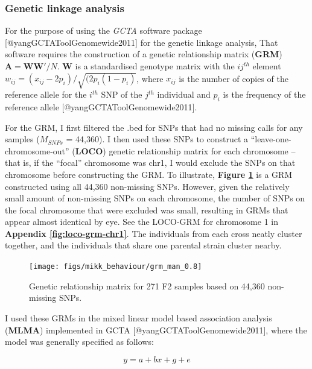 \documentclass[
]{article}
\begin{document}
\hypertarget{genetic-linkage-analysis}{%
\subsubsection{Genetic linkage analysis}\label{genetic-linkage-analysis}}

For the purpose of using the \emph{GCTA} software package {[}@yangGCTAToolGenomewide2011{]} for the genetic linkage analysis, That software requires the construction of a genetic relationship matrix (\textbf{GRM}) \(\textbf{A} = \textbf{WW}'/N\). \(\textbf{W}\) is a standardised genotype matrix with the \(ij^{th}\) element \(w_{ij} = (x_{ij} - 2p_i) / \sqrt{(2p_i(1-p_i)}\), where \(x_{ij}\) is the number of copies of the reference allele for the \(i^{th}\) SNP of the \(j^{th}\) individual and \(p_i\) is the frequency of the reference allele {[}@yangGCTAToolGenomewide2011{]}.

For the GRM, I first filtered the .bed for SNPs that had no missing calls for any samples (\(M_{SNPs}\) = 44,360). I then used these SNPs to construct a ``leave-one-chromosome-out'' (\textbf{LOCO}) genetic relationship matrix for each chromosome -- that is, if the ``focal'' chromosome was chr1, I would exclude the SNPs on that chromosome before constructing the GRM. To illustrate, \textbf{Figure \ref{fig:F2-grm}} is a GRM constructed using all 44,360 non-missing SNPs. However, given the relatively small amount of non-missing SNPs on each chromosome, the number of SNPs on the focal chromosome that were excluded was small, resulting in GRMs that appear almost identical by eye. See the LOCO-GRM for chromosome 1 in \textbf{Appendix \ref{fig:loco-grm-chr1}}. The individuals from each cross neatly cluster together, and the individuals that share one parental strain cluster nearby.



\begin{figure}
\texttt{[image: figs/mikk\_behaviour/grm\_man\_0.8]} \caption{Genetic relationship matrix for 271 F2 samples based on 44,360 non-missing SNPs.}\label{fig:F2-grm}
\end{figure}

I used these GRMs in the mixed linear model based association analysis (\textbf{MLMA}) implemented in GCTA {[}@yangGCTAToolGenomewide2011{]}, where the model was generally specified as follows:

\[
y = a + bx + g + e
\]
\end{document}
